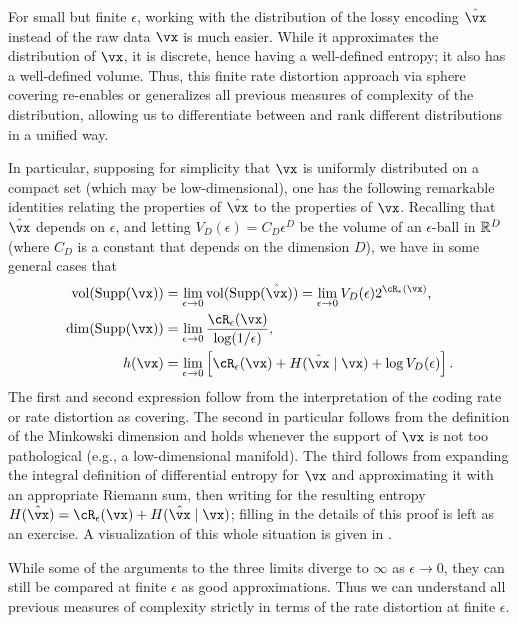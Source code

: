 \documentclass[../../book-main.tex]{subfiles}
\begin{document}
\begin{remark}
	For small but finite \(\epsilon\), working with the distribution of the lossy encoding \(\hat \vx\) instead of the raw data \(\vx\) is much easier. While it approximates the distribution of \(\vx\), it is discrete, hence having a well-defined entropy; it also has a well-defined volume. Thus, this finite rate distortion approach via sphere covering re-enables or generalizes all previous measures of complexity of the distribution, allowing us to differentiate between and rank different distributions in a unified way.

	In particular, supposing for simplicity that \(\vx\) is uniformly distributed on a compact set (which may be low-dimensional), one has the following remarkable identities relating the properties of \(\hat{\vx}\) to the properties of \(\vx\). Recalling that \(\hat{\vx}\) depends on \(\epsilon\), and letting \(V_{D}(\epsilon) = C_{D}\epsilon^{D}\) be the volume of an \(\epsilon\)-ball in \(\mathbb{R}^{D}\) (where \(C_{D}\) is a constant that depends on the dimension \(D\)), we have in some general cases that
	\begin{align}
		\operatorname{vol}(\Supp(\vx))
		&= \lim_{\epsilon \to 0}\operatorname{vol}(\Supp(\hat \vx)) = \lim_{\epsilon \to 0}V_{D}(\epsilon)2^{\cR_{\epsilon}(\vx)}, \\
		\dim(\Supp(\vx))
		&= \lim_{\epsilon \to 0}\frac{\cR_{\epsilon}(\vx)}{\log(1/\epsilon)}, \\
		h(\vx)
		&= \lim_{\epsilon \to 0}\bs{\cR_{\epsilon}(\vx) + H(\hat{\vx} \mid \vx) + \log V_{D}(\epsilon)}.
	\end{align}
	The first and second expression follow from the interpretation of the coding rate or rate distortion as covering. The second in particular follows from the definition of the Minkowski dimension \citep{bishop2017fractals} and holds whenever the support of \(\vx\) is not too pathological (e.g., a low-dimensional manifold). The third follows from expanding the integral definition of differential entropy for \(\vx\) and approximating it with an appropriate Riemann sum, then writing for the resulting entropy \(H(\hat{\vx}) = \cR_{\epsilon}(\vx) + H(\hat{\vx} \mid \vx)\); filling in the details of this proof is left as an exercise. A visualization of this whole situation is given in .

	While some of the arguments to the three limits diverge to \(\infty\) as \(\epsilon \to 0\), they can still be compared at finite \(\epsilon\) as good approximations. Thus we can understand all previous measures of complexity strictly in terms of the rate distortion at finite \(\epsilon\).
\end{remark}
\end{document}
